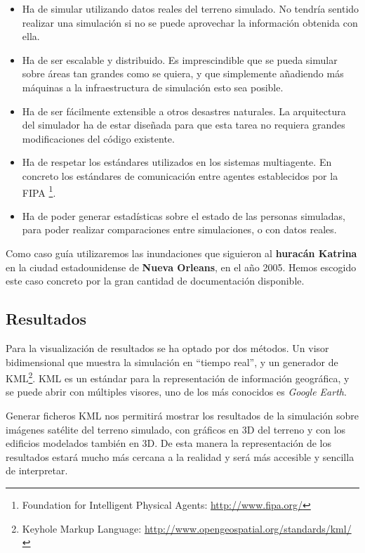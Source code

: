 \begin{itemize}
 \item Ha de simular utilizando datos reales del terreno simulado. No tendría
sentido realizar una simulación si no se puede aprovechar la información
obtenida con ella.
 \item Ha de ser escalable y distribuido. Es imprescindible que se pueda
simular sobre áreas tan grandes como se quiera, y que simplemente añadiendo más
máquinas a la infraestructura de simulación esto sea posible.
 \item Ha de ser fácilmente extensible a otros desastres naturales. La
arquitectura del simulador ha de estar diseñada para que esta tarea no requiera
grandes modificaciones del código existente.
 \item Ha de respetar los estándares utilizados en los sistemas multiagente. En
concreto los estándares de comunicación entre agentes establecidos por la FIPA
\footnote{Foundation for Intelligent Physical Agents:
\url{http://www.fipa.org/}}.
 \item Ha de poder generar estadísticas sobre el estado de las personas
simuladas, para poder realizar comparaciones entre simulaciones, o con datos
reales.
\end{itemize}

Como caso guía utilizaremos las inundaciones que siguieron al {\bf huracán
Katrina} en la ciudad estadounidense de {\bf Nueva Orleans}, en el año 2005.
Hemos escogido este caso concreto por la gran cantidad de documentación
disponible.

\subsection*{Resultados}

Para la visualización de resultados se ha optado por dos métodos. Un visor
bidimensional que muestra la simulación en ``tiempo real'', y un generador de
KML\footnote{Keyhole Markup Language:
\url{http://www.opengeospatial.org/standards/kml/}}. KML es un estándar para la
representación de información geográfica, y se puede abrir con múltiples
visores, uno de los más conocidos es {\em Google Earth}.

Generar ficheros KML nos permitirá mostrar los resultados de la simulación
sobre imágenes satélite del terreno simulado, con gráficos en 3D del terreno y
con los edificios modelados también en 3D. De esta manera la representación de
los resultados estará mucho más cercana a la realidad y será más accesible y
sencilla de interpretar.

